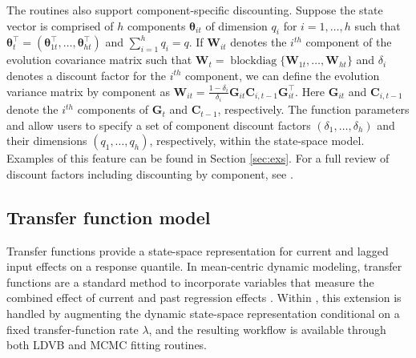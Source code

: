 \documentclass{jss}
\newcommand{\vect}[1]{\boldsymbol{#1}}
\newcommand{\mat}[1]{\mathbf{#1}}
\begin{document}
The routines also support component-specific discounting. Suppose the state vector is comprised of $h$ components $\vect{\theta}_{it}$ of dimension $q_i$ for $i=1,\dots,h$ such that $\vect{\theta}_{t}^\top = (\vect{\theta}_{1t}^\top,\dots,\vect{\theta}_{ht}^\top)$ and $\sum_{i=1}^{h} q_i = q$. If $\mat{W}_{it}$ denotes the $i^{th}$ component of the evolution covariance matrix such that $\mat{W}_t = \operatorname{blockdiag}\{ \mat{W}_{1t},\dots,\mat{W}_{ht}\}$ and $\delta_i$ denotes a discount factor for the $i^{th}$ component, we can define the evolution variance matrix by component as $\mat{W}_{it} = \frac{1-\delta_i}{\delta_i} \mat{G}_{it} \mat{C}_{i,t-1} \mat{G}_{it}^\top$. Here $\mat{G}_{it}$ and $\mat{C}_{i,t-1}$ denote the $i^{th}$ components of $\mat{G}_t$ and $\mat{C}_{t-1}$, respectively. The function parameters  and  allow users to specify a set of component discount factors $(\delta_1,\dots,\delta_h)$ and their dimensions $(q_1,\dots,q_h)$, respectively, within the state-space model. Examples of this feature can be found in Section \ref{sec:exs}. For a full review of discount factors including discounting by component, see \cite{west1997bayesian}.


\subsection{Transfer function model}
\label{sec:tf}

Transfer functions provide a state-space representation for current and lagged input effects on a response quantile. In mean-centric dynamic modeling, transfer functions are a standard method to incorporate variables that measure the combined effect of current and past regression effects \citep{west1997bayesian}. Within , this extension is handled by augmenting the dynamic state-space representation conditional on a fixed transfer-function rate \(\lambda\), and the resulting workflow is available through both LDVB and MCMC fitting routines.
\end{document}
